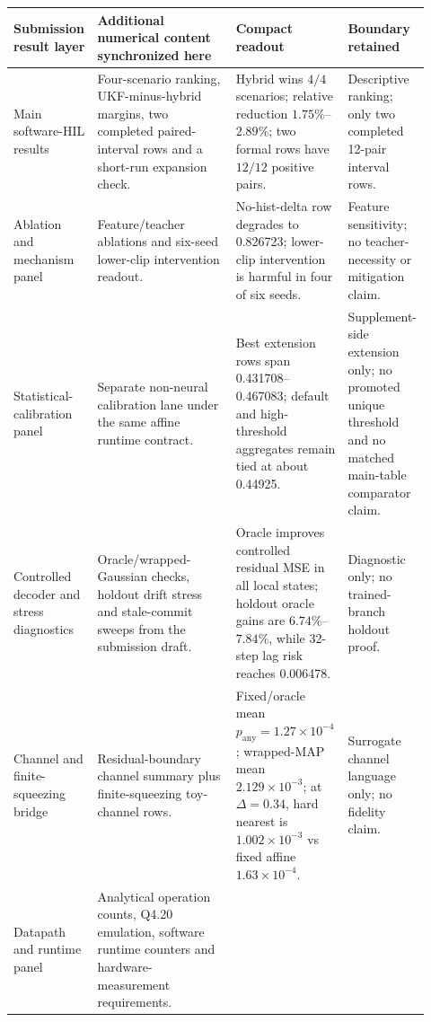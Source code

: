 \documentclass[11pt]{article}
\begin{document}
\begin{table}[ht]
\centering
\scriptsize
\setlength{\tabcolsep}{3pt}
\begin{tabular}{>{\raggedright\arraybackslash}p{0.18\linewidth}
                >{\raggedright\arraybackslash}p{0.33\linewidth}
                >{\raggedright\arraybackslash}p{0.24\linewidth}
                >{\raggedright\arraybackslash}p{0.17\linewidth}}
\toprule
Submission result layer & Additional numerical content synchronized here & Compact readout & Boundary retained \\
\midrule
Main software-HIL results & Four-scenario ranking, UKF-minus-hybrid margins,
two completed paired-interval rows and a short-run expansion check. &
Hybrid wins \(4/4\) scenarios; relative reduction \(1.75\%\)--\(2.89\%\);
two formal rows have \(12/12\) positive pairs. &
Descriptive ranking; only two completed 12-pair interval rows. \\
\addlinespace
Ablation and mechanism panel & Feature/teacher ablations and six-seed
lower-clip intervention readout. &
No-hist-delta row degrades to 0.826723; lower-clip intervention is harmful in
four of six seeds. &
Feature sensitivity; no teacher-necessity or mitigation claim. \\
\addlinespace
Statistical-calibration panel & Separate non-neural calibration lane under the
same affine runtime contract. &
Best extension rows span 0.431708--0.467083; default and high-threshold
aggregates remain tied at about 0.44925. &
Supplement-side extension only; no promoted unique threshold and no matched
main-table comparator claim. \\
\addlinespace
Controlled decoder and stress diagnostics & Oracle/wrapped-Gaussian checks,
holdout drift stress and stale-commit sweeps from the submission draft. &
Oracle improves controlled residual MSE in all local states; holdout oracle
gains are \(6.74\%\)--\(7.84\%\), while 32-step lag risk reaches 0.006478. &
Diagnostic only; no trained-branch holdout proof. \\
\addlinespace
Channel and finite-squeezing bridge & Residual-boundary channel summary plus
finite-squeezing toy-channel rows. &
Fixed/oracle mean \(p_{\mathrm{any}}=1.27{\times}10^{-4}\);
wrapped-MAP mean \(2.129{\times}10^{-3}\); at \(\Delta=0.34\), hard nearest
is \(1.002{\times}10^{-3}\) vs fixed affine \(1.63{\times}10^{-4}\). &
Surrogate channel language only; no fidelity claim. \\
\addlinespace
Datapath and runtime panel & Analytical operation counts, Q4.20 emulation,
software runtime counters and hardware-measurement requirements. &

\end{tabular}
\end{table}
\end{document}
